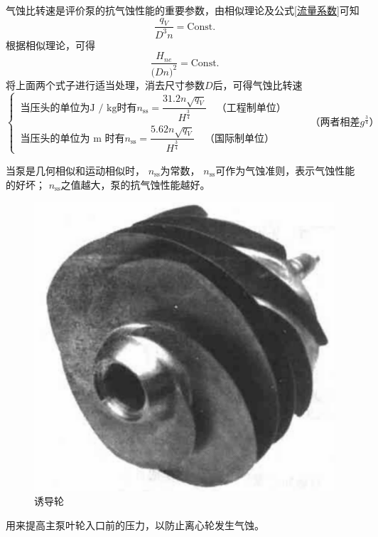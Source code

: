 \blue[(5)]\hspace*{0.3em} 

气蚀比转速是评价泵的抗气蚀性能的重要参数，由相似理论及公式\eqref{流量系数}可知
\begin{equation*}
	\dfrac{q_V}{D^3 n} = \text{Const.}
\end{equation*}
根据相似理论，可得
\begin{equation*}
	\dfrac{H_{ne}}{\big(Dn\big)^2} = \text{Const.}
\end{equation*}
将上面两个式子进行适当处理，消去尺寸参数$D$后，可得气蚀比转速
\begin{equation*}
	\begin{cases}
		\, \mbox{当压头的单位为}\text{J / kg}\mbox{时有}n_\text{ss} = \dfrac{31.2 n\sqrt{q_V}}{H^{\textstyle \frac{3}{4}}}\quad \mbox{（工程制单位）}\\[1.5em]
		\, \mbox{当压头的单位为 m 时有}n_\text{ss} = \dfrac{5.62 n\sqrt{q_V}}{H^{\textstyle \frac{3}{4}}} \quad \mbox{（国际制单位）}
	\end{cases}
	\qquad \mbox{（两者相差} g^{\frac{3}{4}}\mbox{）}
\end{equation*}

当泵是几何相似和运动相似时， $n_{\text{ss}}$为常数， $n_{\text{ss}}$可作为气蚀准则，表示气蚀性能的好坏； $n_{\text{ss}}$之值越大，泵的抗气蚀性能越好。
\vspace*{1em}

\sssection[诱导轮]

\begin{figure}[!htb]
	\centering
	\includegraphics[width=0.25\linewidth]{pic/诱导轮.jpg}
	\caption{诱导轮}
\end{figure}

\blue[主要作用]\quad 用来提高主泵叶轮入口前的压力，以防止离心轮发生气蚀。

